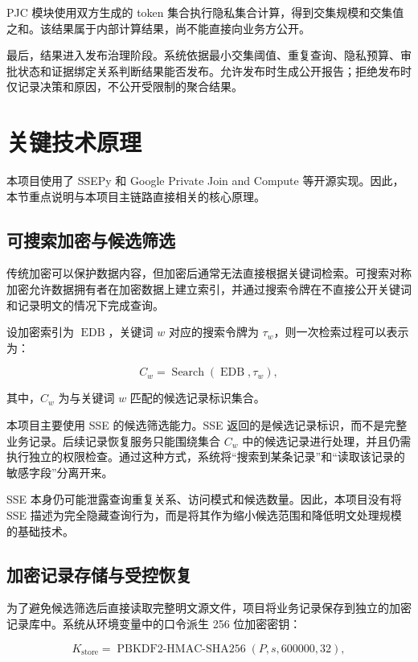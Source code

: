 \documentclass[UTF8,a4paper,12pt,oneside]{ctexrep}
\begin{document}
PJC 模块使用双方生成的 token 集合执行隐私集合计算，得到交集规模和交集值之和。该结果属于内部计算结果，尚不能直接向业务方公开。

最后，结果进入发布治理阶段。系统依据最小交集阈值、重复查询、隐私预算、审批状态和证据绑定关系判断结果能否发布。允许发布时生成公开报告；拒绝发布时仅记录决策和原因，不公开受限制的聚合结果。

\section{关键技术原理}

本项目使用了 SSEPy 和 Google Private Join and Compute 等开源实现。因此，本节重点说明与本项目主链路直接相关的核心原理。

\subsection{可搜索加密与候选筛选}

传统加密可以保护数据内容，但加密后通常无法直接根据关键词检索。可搜索对称加密允许数据拥有者在加密数据上建立索引，并通过搜索令牌在不直接公开关键词和记录明文的情况下完成查询。

设加密索引为 $\operatorname{EDB}$，关键词 $w$ 对应的搜索令牌为 $\tau_w$，则一次检索过程可以表示为：

\begin{equation}
C_w=\operatorname{Search}(\operatorname{EDB},\tau_w),
\end{equation}

其中，$C_w$ 为与关键词 $w$ 匹配的候选记录标识集合。

本项目主要使用 SSE 的候选筛选能力。SSE 返回的是候选记录标识，而不是完整业务记录。后续记录恢复服务只能围绕集合 $C_w$ 中的候选记录进行处理，并且仍需执行独立的权限检查。通过这种方式，系统将“搜索到某条记录”和“读取该记录的敏感字段”分离开来。

SSE 本身仍可能泄露查询重复关系、访问模式和候选数量。因此，本项目没有将 SSE 描述为完全隐藏查询行为，而是将其作为缩小候选范围和降低明文处理规模的基础技术。

\subsection{加密记录存储与受控恢复}

为了避免候选筛选后直接读取完整明文源文件，项目将业务记录保存到独立的加密记录库中。系统从环境变量中的口令派生 256 位加密密钥：

\begin{equation}
K_{\mathrm{store}}
=
\operatorname{PBKDF2\text{-}HMAC\text{-}SHA256}
(P,s,600000,32),
\end{equation}
\end{document}
